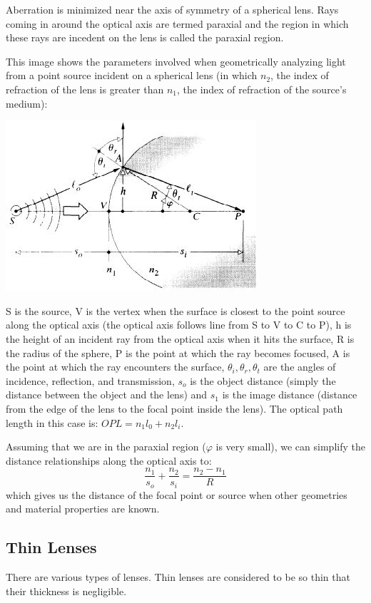 \documentclass[12pt]{report}
\begin{document}
Aberration is minimized near the axis of symmetry of a spherical lens. Rays coming in around the optical axis are termed paraxial and the region in which these rays are incedent on the lens is called the paraxial region. 

This image shows the parameters involved when geometrically analyzing light from a point source incident on a spherical lens (in which $n_2$, the index of refraction of the lens is greater than $n_1$, the index of refraction of the source's medium): 

\includegraphics[scale=.75]{SphericalLens1.jpg}

S is the source, V is the vertex when the surface is closest to the point source along the optical axis (the optical axis follows line from S to V to C to P), h is the height of an incident ray from the optical axis when it hits the surface, R is the radius of the sphere, P is the point at which the ray becomes focused, A is the point at which the ray encounters the surface, $\theta_i, \theta_r, \theta_t$ are the angles of incidence, reflection, and transmission, $s_o$ is the object distance (simply the distance between the object and the lens) and $s_1$ is the image distance (distance from the edge of the lens to the focal point inside the lens). The optical path length in this case is: $OPL = n_1 l_0 + n_2 l_i$. 

Assuming that we are in the paraxial region ($\varphi$ is very small), we can simplify the distance relationships along the optical axis to: \[\frac{n_1}{s_o}+\frac{n_2}{s_i}=\frac{n_2-n_1}{R} \] which gives us the distance of the focal point or source when other geometries and material properties are known. 

\subsection{Thin Lenses}
There are various types of lenses. Thin lenses are considered to be so thin that their thickness is negligible.
\end{document}

